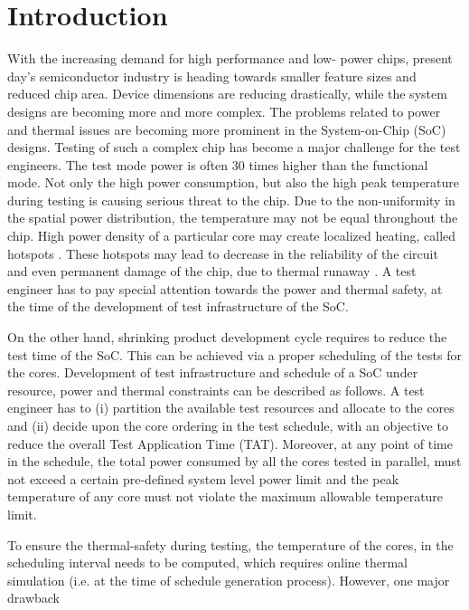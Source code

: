 \documentclass[conference]{IEEEtran}
\begin{document}
	\section{Introduction}
	\label{sec: 1}
	With the increasing demand for high performance and low-
power chips, present day’s semiconductor industry is heading
towards smaller feature sizes and reduced chip area. Device
dimensions are reducing drastically, while the system designs
are becoming more and more complex. The problems related to
power and thermal issues are becoming more prominent in the
System-on-Chip (SoC) designs. Testing of such a complex chip
has become a major challenge for the test engineers. The test
mode power is often 30 times higher than the functional mode.
Not only the high power consumption, but also the high peak
temperature during testing is causing serious threat to the chip.
Due to the non-uniformity in the spatial power distribution,
the temperature may not be equal throughout the chip. High
power density of a particular core may create localized heating,
called hotspots \cite{cho2006peakaso:1}. These hotspots may lead to decrease in
the reliability of the circuit and even permanent damage of the
chip, due to thermal runaway \cite{girard2002survey}. A test engineer has to pay
special attention towards the power and thermal safety, at the
time of the development of test infrastructure of the SoC.\\
	\par
	On the other hand, shrinking product development cycle
requires to reduce the test time of the SoC. This can be
achieved via a proper scheduling of the tests for the cores.
Development of test infrastructure and schedule of a SoC under
resource, power and thermal constraints can be described as
follows. A test engineer has to (i) partition the available test
resources and allocate to the cores and (ii) decide upon the core
ordering in the test schedule, with an objective to reduce the
overall Test Application Time (TAT). Moreover, at any point
of time in the schedule, the total power consumed by all the
cores tested in parallel, must not exceed a certain pre-defined
system level power limit and the peak temperature of any core
must not violate the maximum allowable temperature limit.\\
	\par 
	To ensure the thermal-safety during testing, the temperature
of the cores, in the scheduling interval needs to be computed,
which requires online thermal simulation (i.e. at the time of
schedule generation process). However, one major drawback
\end{document}
